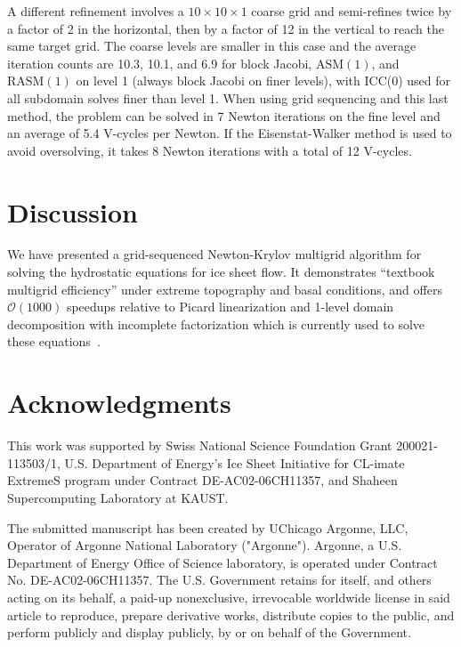 \documentclass[3p]{elsarticle}
\newcommand{\ASM}{\mathrm{ASM}}
\newcommand{\RASM}{\mathrm{RASM}}
\newcommand{\bigO}{{\mathcal{O}}}
\begin{document}
A different refinement involves a $10\times 10\times 1$ coarse grid and semi-refines twice by a factor of 2 in the horizontal, then by a factor of 12 in the vertical to reach the same target grid.  The coarse levels are smaller in this case and the average iteration counts are 10.3, 10.1, and 6.9 for block Jacobi, $\ASM(1)$, and $\RASM(1)$ on level 1 (always block Jacobi on finer levels), with ICC(0) used for all subdomain solves finer than level 1.  When using grid sequencing and this last method, the problem can be solved in 7 Newton iterations on the fine level and an average of 5.4 V-cycles per Newton. If the Eisenstat-Walker method is used to avoid oversolving, it takes 8 Newton iterations with a total of 12 V-cycles.

\section{Discussion}
We have presented a grid-sequenced Newton-Krylov multigrid algorithm for solving the hydrostatic equations for ice sheet flow.  It demonstrates ``textbook multigrid efficiency'' under extreme topography and basal conditions, and offers $\bigO(1000)$ speedups relative to Picard linearization and 1-level domain decomposition with incomplete factorization which is currently used to solve these equations~\cite{seacism,issm,johnson2007modeling,desmedt2010using,pattyn2003ntd}.

\nonumber\section{Acknowledgments} This work was supported by Swiss National Science Foundation Grant 200021-113503/1, U.S. Department of Energy's Ice Sheet Initiative for CL-imate ExtremeS program under Contract DE-AC02-06CH11357, and Shaheen Supercomputing Laboratory at KAUST.

The submitted manuscript has been created by UChicago Argonne, LLC,
Operator of Argonne National Laboratory ("Argonne").  Argonne, a
U.S. Department of Energy Office of Science laboratory, is operated
under Contract No. DE-AC02-06CH11357.  The U.S. Government retains for
itself, and others acting on its behalf, a paid-up nonexclusive,
irrevocable worldwide license in said article to reproduce, prepare
derivative works, distribute copies to the public, and perform
publicly and display publicly, by or on behalf of the Government.



\end{document}
